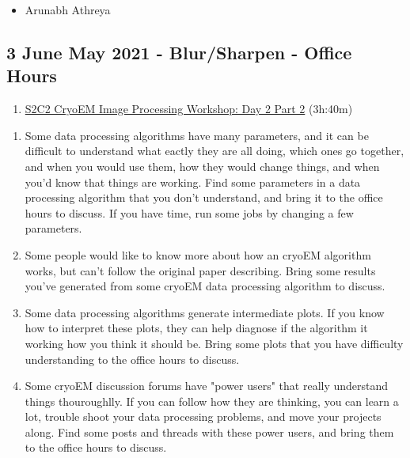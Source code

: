 \documentclass[11pt, oneside]{article}   	%
\begin{document}
\begin{itemize}
	\item Arunabh Athreya 
\end{itemize}


\pagebreak
\subsection{3 June May 2021 - Blur/Sharpen - Office Hours}
\begin{enumerate}
	\item \href{https://youtu.be/HXIipHORI2Y}{S2C2 CryoEM Image Processing Workshop: Day 2 Part 2} (3h:40m)
	\end{enumerate}
\begin{enumerate}
	\item Some data processing algorithms have many parameters, and it can be difficult to understand what eactly they are all doing, which ones go together, and when you would use them, how they would change things, and when you'd know that things are working. Find some parameters in a data processing algorithm that you don't understand, and bring it to the office hours to discuss. If you have time, run some jobs by changing a few parameters.
	\item Some people would like to know more about how an cryoEM algorithm works, but can't follow the original paper describing. Bring some results you've generated from some cryoEM data processing algorithm to discuss.
	\item Some data processing algorithms generate intermediate plots. If you know how to interpret these plots, they can help diagnose if the algorithm it working how you think it should be. Bring some plots that you have difficulty understanding to the office hours to discuss.  
	\item Some cryoEM discussion forums have "power users" that really understand things thouroughlly. If you can follow how they are thinking, you can learn a lot, trouble shoot your data processing problems, and move your projects along. Find some posts and threads with these power users, and bring them to the office hours to discuss.
\end{enumerate}
\end{document}
